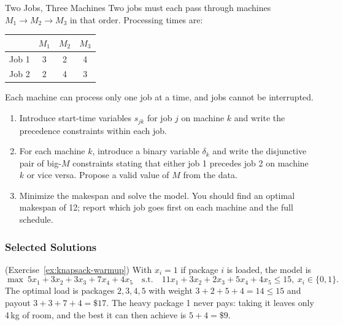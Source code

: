 \begin{ex}{Two Jobs, Three Machines}{}
\label{ex:flowshop}
 Two jobs must each pass through machines $M_1 \to M_2 \to M_3$ in that order.  Processing times are:

\begin{center}
\begin{tabular}{l|c|c|c}
 & $M_1$ & $M_2$ & $M_3$ \\
\hline
Job 1 & 3 & 2 & 4 \\
Job 2 & 2 & 4 & 3 \\
\end{tabular}
\par{}\label{tab:integerProgrammingFormulations-book1-tab07}%

\end{center}

Each machine can process only one job at a time, and jobs cannot be interrupted.
\begin{enumerate}
\item Introduce start-time variables $s_{jk}$ for job $j$ on machine $k$ and write the precedence constraints within each job.
\item For each machine $k$, introduce a binary variable $\delta_k$ and write the disjunctive pair of big-$M$ constraints stating that either job 1 precedes job 2 on machine $k$ or vice versa.  Propose a valid value of $M$ from the data.
\item Minimize the makespan and solve the model.  You should find an optimal makespan of 12; report which job goes first on each machine and the full schedule.
\end{enumerate}
\exrefs{\S\ref{sec:job-shop}, \S\ref{subsec:multi-term-disjunction}, \S\ref{subsec:big-M-activation}}
\end{ex}

\subsubsection*{Selected Solutions}

\begin{solution}(Exercise~\ref{ex:knapsack-warmup})
With $x_i = 1$ if package $i$ is loaded, the model is
\[
\max\ 5x_1 + 3x_2 + 3x_3 + 7x_4 + 4x_5
\quad \text{s.t.} \quad
11x_1 + 3x_2 + 2x_3 + 5x_4 + 4x_5 \leq 15,\ x_i \in \{0,1\}.
\]
The optimal load is packages $2, 3, 4, 5$ with weight $3+2+5+4 = 14 \leq 15$ and payout $3+3+7+4 = \$17$.  The heavy package 1 never pays: taking it leaves only 4\,kg of room, and the best it can then achieve is $5 + 4 = \$9$.
\end{solution}

